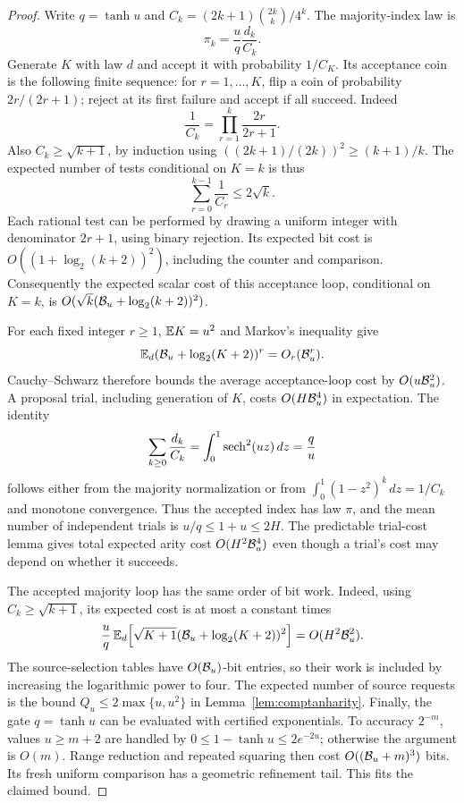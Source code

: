 \begin{proof}
Write $q=\tanh u$ and
$C_k=(2k+1)\binom{2k}{k}/4^k$. The majority-index law is
\[
 \pi_k=\frac{u}{q}\frac{d_k}{C_k}.
\]
Generate $K$ with law $d$ and accept it with probability
$1/C_K$. Its acceptance coin is the following finite sequence:
for $r=1,\ldots,K$, flip a coin of probability $2r/(2r+1)$;
reject at its first failure and accept if all succeed.
Indeed
\[
 \frac1{C_k}=\prod_{r=1}^k\frac{2r}{2r+1}.
\]
Also $C_k\ge\sqrt{k+1}$, by induction using
$((2k+1)/(2k))^2\ge(k+1)/k$.
The expected number of tests conditional on $K=k$ is thus
\[
 \sum_{r=0}^{k-1}\frac1{C_r}\le2\sqrt{k}.
\]
Each rational test can be performed by drawing a uniform
integer with denominator $2r+1$, using binary rejection.
Its expected bit cost is $O((1+\log_2(k+2))^2)$, including
the counter and comparison. Consequently the expected scalar
cost of this acceptance loop, conditional on $K=k$, is
$O(\sqrt{k}(\mathcal B_u+\log_2(k+2))^2)$.

For each fixed integer $r\ge1$, $\mathbb E K=u^2$ and Markov's
inequality give
\[
 \mathbb E_d(\mathcal B_u+\log_2(K+2))^r=O_r(\mathcal B_u^r).
\]
Cauchy--Schwarz therefore bounds the average acceptance-loop
cost by $O(u\mathcal B_u^2)$. A proposal trial, including generation
of $K$, costs $O(H\mathcal B_u^4)$ in expectation.
The identity
\[
 \sum_{k\ge0}\frac{d_k}{C_k}
 =\int_0^1\operatorname{sech}^2(uz)\,dz=\frac qu
\]
follows either from the majority normalization or from
$\int_0^1(1-z^2)^k\,dz=1/C_k$ and monotone convergence.
Thus the accepted index has law $\pi$, and the mean number
of independent trials is $u/q\le1+u\le2H$.
The predictable trial-cost lemma gives total expected arity
cost $O(H^2\mathcal B_u^4)$ even though a trial's cost may depend
on whether it succeeds.

The accepted majority loop has the same order of bit work.
Indeed, using $C_k\ge\sqrt{k+1}$, its expected cost is at most
a constant times
\[
 \frac uq\,
 \mathbb E_d\!\left[
 \sqrt{K+1}(\mathcal B_u+\log_2(K+2))^2\right]
 =O(H^2\mathcal B_u^2).
\]
The source-selection tables have $O(\mathcal B_u)$-bit entries,
so their work is included by increasing the logarithmic power
to four. The expected number of source requests is the
bound $Q_u\le2\max\{u,u^2\}$ in Lemma~\ref{lem:comptanharity}.
Finally, the gate $q=\tanh u$ can be evaluated with certified
exponentials. To accuracy $2^{-m}$, values
$u\ge m+2$ are handled by
$0\le1-\tanh u\le2e^{-2u}$; otherwise the argument is
$O(m)$. Range reduction and repeated squaring then cost
$O((\mathcal B_u+m)^3)$ bits. Its fresh uniform comparison has
a geometric refinement tail. This fits the claimed bound.
\end{proof}


